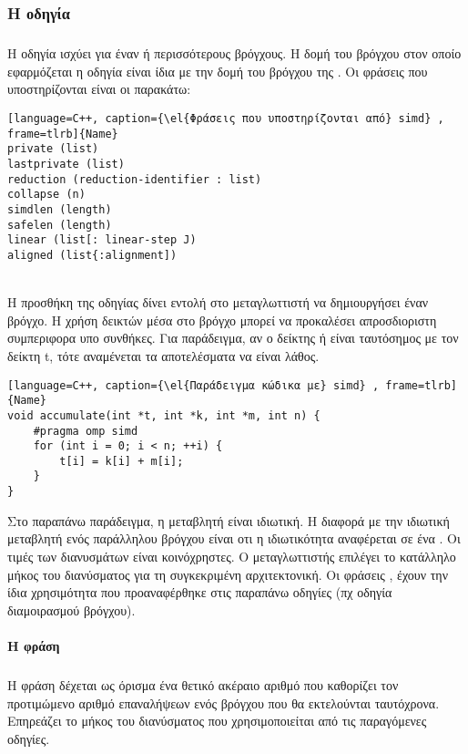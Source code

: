 \subsubsection{Η οδηγία \emph{}}
\subparagraph{}
Η οδηγία \emph{} ισχύει για έναν ή περισσότερους βρόγχους. Η δομή του βρόγχου στον οποίο εφαρμόζεται η οδηγία είναι ίδια με την δομή του βρόγχου της \emph{}. Οι φράσεις που υποστηρίζονται είναι οι παρακάτω:
\begin{lstlisting}[language=C++, caption={\el{Φράσεις που υποστηρίζονται από} simd} , frame=tlrb]{Name}
private (list)
lastprivate (list)
reduction (reduction-identifier : list)
collapse (n)
simdlen (length)
safelen (length)
linear (list[: linear-step J)
aligned (list{:alignment])
\end{lstlisting}
\ \\
Η προσθήκη της οδηγίας \emph{} δίνει εντολή στο μεταγλωττιστή να δημιουργήσει έναν \emph{} βρόγχο.
Η χρήση δεικτών μέσα στο βρόγχο μπορεί να προκαλέσει απροσδιοριστη συμπεριφορα υπο συνθήκες. Για παράδειγμα, αν ο δείκτης \emph{} ή \emph{} είναι ταυτόσημος με τον δείκτη t, τότε αναμένεται τα αποτελέσματα να είναι λάθος.
\ \\

\begin{lstlisting}[language=C++, caption={\el{Παράδειγμα κώδικα με} simd} , frame=tlrb]{Name}
void accumulate(int *t, int *k, int *m, int n) {
	#pragma omp simd
	for (int i = 0; i < n; ++i) {
		t[i] = k[i] + m[i];
	}
}
\end{lstlisting}

\clearpage
Στο παραπάνω παράδειγμα, η μεταβλητή \emph{} είναι ιδιωτική. Η διαφορά με την ιδιωτική μεταβλητή ενός παράλληλου βρόγχου είναι οτι η ιδιωτικότητα αναφέρεται σε ένα \emph{}. Oι τιμές των διανυσμάτων \emph{} είναι κοινόχρηστες. Ο μεταγλωττιστής επιλέγει το κατάλληλο μήκος του διανύσματος για τη συγκεκριμένη αρχιτεκτονική. 
Οι φράσεις \emph{}, έχουν την ίδια χρησιμότητα που προαναφέρθηκε στις παραπάνω οδηγίες (πχ οδηγία διαμοιρασμού βρόγχου).


\paragraph{H φράση \emph{}}
\subparagraph{}
Η φράση \emph{} δέχεται ως όρισμα ένα θετικό ακέραιο αριθμό που καθορίζει τον προτιμώμενο αριθμό επαναλήψεων ενός βρόγχου που θα εκτελούνται ταυτόχρονα. Επηρεάζει το μήκος του διανύσματος που χρησιμοποιείται από τις παραγόμενες \emph{} οδηγίες.

